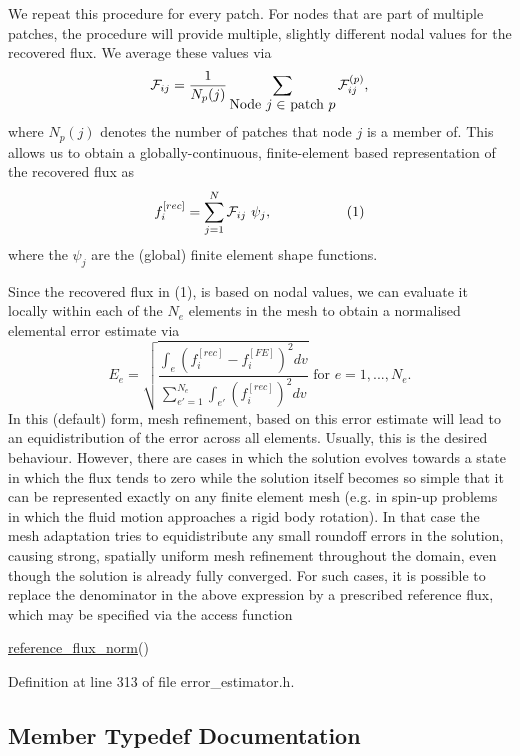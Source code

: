 \begin{DoxyEnumerate}
We repeat this procedure for every patch. For nodes that are part of multiple patches, the procedure will provide multiple, slightly different nodal values for the recovered flux. We average these values via \[ {\cal F}_{ij} = \frac{1}{N_p(j)} \sum_{\mbox{Node $j \in $ patch $p$}} {\cal F}^{(p)}_{ij}, \] where $N_p(j)$ denotes the number of patches that node $ j$ is a member of. This allows us to obtain a globally-\/continuous, finite-\/element based representation of the recovered flux as \[ f_i^{[rec]} = \sum_{j=1}^{N} {\cal F}_{ij}\ \psi_j, \ \ \ \ \ \ \ \ \ \ \ \ \ \ \ \ (1) \] where the $ \psi_j $ are the (global) finite element shape functions.
\item Since the recovered flux in (1), is based on nodal values, we can evaluate it locally within each of the $ N_e$ elements in the mesh to obtain a normalised elemental error estimate via \[ E_{e} = \sqrt{ \frac{ \int_{\mbox{$e$}} \left( f_i^{[rec]} - f_i^{[FE]} \right)^2 dv} {\sum_{e'=1}^{N_e} \int_{\mbox{$e'$}} \left( f_i^{[rec]} \right)^2 dv} } \mbox{\ \ \ for $e=1,...,N_e$.} \] In this (default) form, mesh refinement, based on this error estimate will lead to an equidistribution of the error across all elements. Usually, this is the desired behaviour. However, there are cases in which the solution evolves towards a state in which the flux tends to zero while the solution itself becomes so simple that it can be represented exactly on any finite element mesh (e.\+g. in spin-\/up problems in which the fluid motion approaches a rigid body rotation). In that case the mesh adaptation tries to equidistribute any small roundoff errors in the solution, causing strong, spatially uniform mesh refinement throughout the domain, even though the solution is already fully converged. For such cases, it is possible to replace the denominator in the above expression by a prescribed reference flux, which may be specified via the access function 
\begin{DoxyCode}
\hyperlink{classoomph_1_1Z2ErrorEstimator_a997dc6ba0b546a0f7363949a8d33d133}{reference\_flux\_norm}()
\end{DoxyCode}
 
\end{DoxyEnumerate}

Definition at line 313 of file error\+\_\+estimator.\+h.



\subsection{Member Typedef Documentation}
\mbox{\label{classoomph_1_1Z2ErrorEstimator_a75ef55e67b21ec49ed1a37d095cfa9f9}} 
